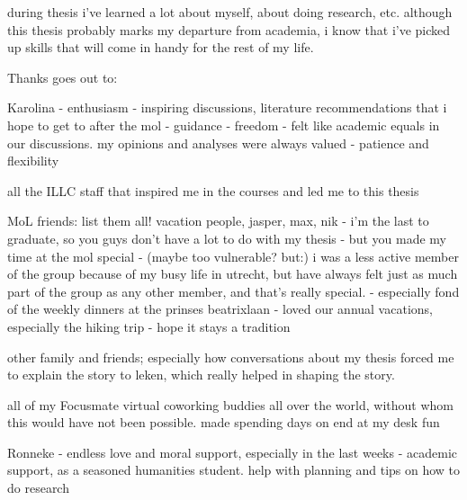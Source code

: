 during thesis i've learned a lot about myself, about doing research, etc. although this thesis probably marks my departure from academia, i know that i've picked up skills that will come in handy for the rest of my life.

Thanks goes out to:

Karolina
- enthusiasm
- inspiring discussions, literature recommendations that i hope to get to after the mol
- guidance
- freedom
- felt like academic equals in our discussions. my opinions and analyses were always valued
- patience and flexibility

all the ILLC staff that inspired me in the courses and led me to this thesis

MoL friends: list them all! vacation people, jasper, max, nik
- i'm the last to graduate, so you guys don't have a lot to do with my thesis
- but you made my time at the mol special
- (maybe too vulnerable? but:) i was a less active member of the group because of my busy life in utrecht, but have always felt just as much part of the group as any other member, and that's really special.
- especially fond of the weekly dinners at the prinses beatrixlaan
- loved our annual vacations, especially the hiking trip
- hope it stays a tradition

other family and friends; especially how conversations about my thesis forced me to explain the story to leken, which really helped in shaping the story.

all of my Focusmate virtual coworking buddies all over the world, without whom this would have not been possible. made spending days on end at my desk fun

Ronneke
- endless love and moral support, especially in the last weeks
- academic support, as a seasoned humanities student. help with planning and tips on how to do research
